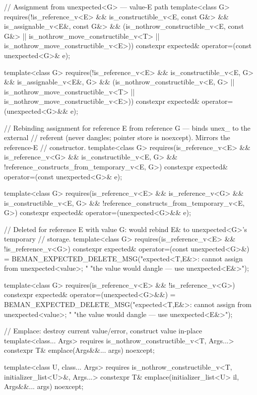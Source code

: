 \begin{codeblock}
{  // Assignment from unexpected<G> — value-E path
  template<class G>
    requires(!is_reference_v<E> && is_constructible_v<E, const G&> &&
             is_assignable_v<E&, const G&> &&
             (is_nothrow_constructible_v<E, const G&> ||
              is_nothrow_move_constructible_v<T> || is_nothrow_move_constructible_v<E>))
  constexpr expected& operator=(const unexpected<G>& e);

  template<class G>
    requires(!is_reference_v<E> && is_constructible_v<E, G> && is_assignable_v<E&, G> &&
             (is_nothrow_constructible_v<E, G> || is_nothrow_move_constructible_v<T> ||
              is_nothrow_move_constructible_v<E>))
  constexpr expected& operator=(unexpected<G>&& e);

  // Rebinding assignment for reference E from reference G — binds unex_ to the external
  // referent (never dangles; pointer store is noexcept). Mirrors the reference-E
  // constructor.
  template<class G>
    requires(is_reference_v<E> && is_reference_v<G> && is_constructible_v<E, G> &&
             !reference_constructs_from_temporary_v<E, G>)
  constexpr expected& operator=(const unexpected<G>& e);

  template<class G>
    requires(is_reference_v<E> && is_reference_v<G> && is_constructible_v<E, G> &&
             !reference_constructs_from_temporary_v<E, G>)
  constexpr expected& operator=(unexpected<G>&& e);

  // Deleted for reference E with value G: would rebind E& to unexpected<G>'s temporary
  // storage.
  template<class G>
    requires(is_reference_v<E> && !is_reference_v<G>)
  constexpr expected& operator=(const unexpected<G>&) =
      BEMAN_EXPECTED_DELETE_MSG("expected<T,E&>: cannot assign from unexpected<value>; "
                                "the value would dangle — use unexpected<E&>");

  template<class G>
    requires(is_reference_v<E> && !is_reference_v<G>)
  constexpr expected& operator=(unexpected<G>&&) =
      BEMAN_EXPECTED_DELETE_MSG("expected<T,E&>: cannot assign from unexpected<value>; "
                                "the value would dangle — use unexpected<E&>");

  // Emplace: destroy current value/error, construct value in-place
  template<class... Args>
    requires is_nothrow_constructible_v<T, Args...>
  constexpr T& emplace(Args&&... args) noexcept;

  template<class U, class... Args>
    requires is_nothrow_constructible_v<T, initializer_list<U>&, Args...>
  constexpr T& emplace(initializer_list<U> il, Args&&... args) noexcept;

}
\end{codeblock}
